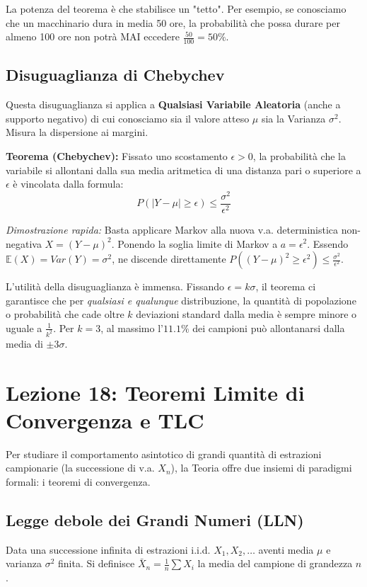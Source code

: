 \documentclass[12pt, a4paper]{article}
\begin{document}
La potenza del teorema è che stabilisce un "tetto". Per esempio, se conosciamo che un macchinario dura in media 50 ore, la probabilità che possa durare per almeno 100 ore non potrà MAI eccedere $\frac{50}{100} = 50\%$.

\subsection{Disuguaglianza di Chebychev}
Questa disuguaglianza si applica a \textbf{Qualsiasi Variabile Aleatoria} (anche a supporto negativo) di cui conosciamo sia il valore atteso $\mu$ sia la Varianza $\sigma^2$. Misura la dispersione ai margini.

\textbf{Teorema (Chebychev):} Fissato uno scostamento $\epsilon > 0$, la probabilità che la variabile si allontani dalla sua media aritmetica di una distanza pari o superiore a $\epsilon$ è vincolata dalla formula:
$$ P(|Y - \mu| \ge \epsilon) \le \frac{\sigma^2}{\epsilon^2} $$

\textit{Dimostrazione rapida:}
Basta applicare Markov alla nuova v.a. deterministica non-negativa $X = (Y - \mu)^2$.
Ponendo la soglia limite di Markov a $a = \epsilon^2$. Essendo $\mathbb{E}(X) = Var(Y) = \sigma^2$, ne discende direttamente $P((Y-\mu)^2 \ge \epsilon^2) \le \frac{\sigma^2}{\epsilon^2}$.

L'utilità della disuguaglianza è immensa. Fissando $\epsilon = k\sigma$, il teorema ci garantisce che per \textit{qualsiasi e qualunque} distribuzione, la quantità di popolazione o probabilità che cade oltre $k$ deviazioni standard dalla media è sempre minore o uguale a $\frac{1}{k^2}$. Per $k=3$, al massimo l'$11.1\%$ dei campioni può allontanarsi dalla media di $\pm 3\sigma$.


\section{Lezione 18: Teoremi Limite di Convergenza e TLC}

Per studiare il comportamento asintotico di grandi quantità di estrazioni campionarie (la successione di v.a. $X_n$), la Teoria offre due insiemi di paradigmi formali: i teoremi di convergenza.

\subsection{Legge debole dei Grandi Numeri (LLN)}
Data una successione infinita di estrazioni i.i.d. $X_1, X_2, \dots$ aventi media $\mu$ e varianza $\sigma^2$ finita. Si definisce $\bar{X}_n = \frac{1}{n} \sum X_i$ la media del campione di grandezza $n$.
\end{document}

